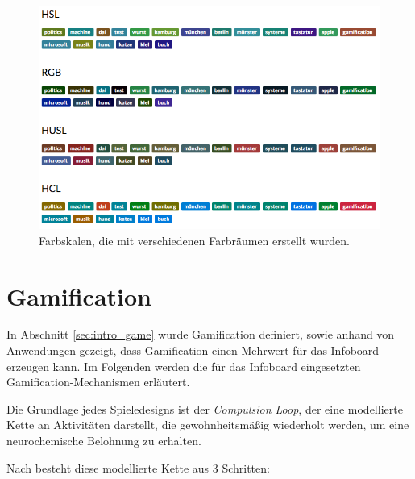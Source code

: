 \documentclass[12pt,twoside]{book}
\begin{document}
\begin{figure}[htbp]
    \centering
    \includegraphics[width=1.0\textwidth]{images/colors}
    \caption{Farbskalen, die mit verschiedenen Farbräumen erstellt wurden.}
    \label{fig:colors}
\end{figure}

\section{Gamification}


In Abschnitt \ref{sec:intro_game} wurde Gamification definiert, sowie anhand von Anwendungen gezeigt, dass Gamification einen Mehrwert für das Infoboard erzeugen kann. Im Folgenden werden die für das Infoboard eingesetzten Gamification-Mechanismen erläutert.

Die Grundlage jedes Spieledesigns ist der \textit{Compulsion Loop}, der eine modellierte Kette an Aktivitäten darstellt, die gewohnheitsmäßig wiederholt werden, um eine neurochemische Belohnung zu erhalten.

Nach \citep{gamasutra} besteht diese modellierte Kette aus 3 Schritten:
\end{document}
